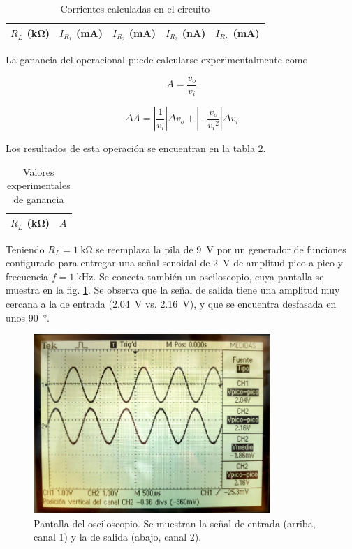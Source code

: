 \begin{table}[H]
    \centering
    \begin{tabular}{@{}rrrrr@{}}
        \toprule
        $R_L$ (\si{\kilo\ohm}) & $I_{R_1}$ (\si{\milli\ampere}) & $I_{R_2}$ (\si{\milli\ampere}) & $I_{R_3}$ (\si{\nano\ampere}) & $I_{R_L}$ (\si{\milli\ampere}) \\
        \midrule
        
    \end{tabular}
    \caption{Corrientes calculadas en el circuito}
    \label{tab:1-datos:corrientes}
\end{table}

La ganancia del operacional puede calcularse experimentalmente como

\begin{equation}
    \label{ec:1-teoria:ganancia-experimental}
    A = \frac{v_o}{v_i}
\end{equation}

\begin{equation}
    \label{ec:1-teoria:err-ganancia-experimental}
    \Delta A = \left| \frac{1}{v_i} \right| \Delta v_o + \left| -\frac{v_o}{{v_i}^2} \right| \Delta v_i
\end{equation}

Los resultados de esta operación se encuentran en la tabla \ref{tab:1-teoria:ganancia-experimental}.


\begin{table}[H]
    \centering
    \begin{tabular}{@{}rr@{}}
        \toprule
        $R_L$ (\si{\kilo\ohm}) & $A$ \\
        \midrule
        
    \end{tabular}
    \caption{Valores experimentales de ganancia}
    \label{tab:1-teoria:ganancia-experimental}
\end{table}

Teniendo $R_L = \SI{1}{\kilo\ohm}$ se reemplaza la pila de \SI{9}{\volt} por
un generador de funciones configurado para entregar una señal senoidal de
\SI{2}{\volt} de amplitud pico-a-pico y frecuencia $f = \SI{1}{\kilo\hertz}$.
Se conecta también un osciloscopio, cuya pantalla
se muestra en la fig. \ref{fig:1-datos:osciloscopio}. Se observa que la señal
de salida tiene una amplitud muy cercana a la de entrada (\SI{2.04}{\volt} vs.
\SI{2.16}{\volt}), y que se encuentra desfasada en unos \SI{90}{\degree}.

\begin{figure}[H]
    \centering
    \includegraphics[width=0.8\textwidth]{img/1/osciloscopio-1.jpg}
    \caption{Pantalla del osciloscopio. Se muestran la señal de entrada
        (arriba, canal 1) y la de salida (abajo, canal 2).}
    \label{fig:1-datos:osciloscopio}
\end{figure}
